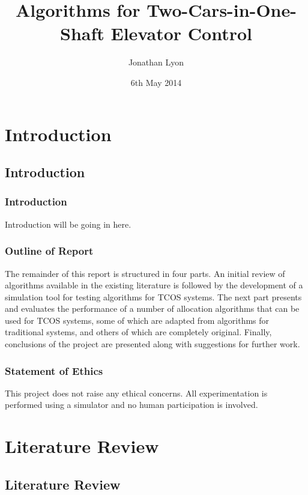 \documentclass{UoYCSproject}
\author{Jonathan Lyon}
\title{Algorithms for Two-Cars-in-One-Shaft Elevator Control}
\date{6th May 2014}
\begin{document}
\maketitle 

\part{Introduction}

\chapter{Introduction}

\section{Introduction}

Introduction will be going in here.

\section{Outline of Report}

The remainder of this report is structured in four parts.  An initial review of algorithms available in the existing literature is followed by the development of a simulation tool for testing algorithms for TCOS systems.  The next part presents and evaluates the performance of a number of allocation algorithms that can be used for TCOS systems, some of which are adapted from algorithms for traditional systems, and others of which are completely original.  Finally, conclusions of the project are presented along with suggestions for further work.

\section{Statement of Ethics}

This project does not raise any ethical concerns.  All experimentation is performed using a simulator and no human participation is involved.

\part{Literature Review}

\chapter{Literature Review}
\end{document}
